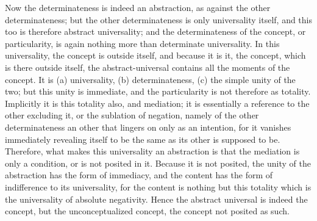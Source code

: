 Now the determinateness is indeed an abstraction,
as against the other determinateness;
but the other determinateness is only universality itself,
and this too is therefore abstract universality;
and the determinateness of the concept, or particularity,
is again nothing more than determinate universality.
In this universality, the concept is outside itself,
and because it is it, the concept,
which is there outside itself,
the abstract-universal contains
all the moments of the concept.
It is
(a) universality,
(b) determinateness,
(c) the simple unity of the two;
but this unity is immediate,
and the particularity is not
therefore as totality.
Implicitly it is this totality also, and mediation;
it is essentially a reference to the other excluding it,
or the sublation of negation,
namely of the other determinateness
an other that lingers on only as an intention,
for it vanishes immediately revealing itself to be
the same as its other is supposed to be.
Therefore, what makes this universality an abstraction
is that the mediation is only a condition,
or is not posited in it.
Because it is not posited,
the unity of the abstraction has the form of immediacy,
and the content has the form of indifference to its universality,
for the content is nothing but this totality
which is the universality of absolute negativity.
Hence the abstract universal is indeed the concept,
but the unconceptualized concept,
the concept not posited as such.

